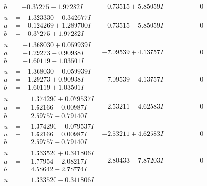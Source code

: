 \documentclass[1p]{elsarticle_modified}
\theoremstyle{definition}
\begin{document}
$$\begin{array}{c|c|c}
\begin{aligned}
b &= -0.37275 - 1.97282 I\end{aligned}
 & -0.73515 + 5.85059 I & \phantom{-0.000000 } 0 \\ \hline\begin{aligned}
u &= -1.323330 - 0.342677 I \\
a &= -0.124269 + 1.289700 I \\
b &= -0.37275 + 1.97282 I\end{aligned}
 & -0.73515 - 5.85059 I & \phantom{-0.000000 } 0 \\ \hline\begin{aligned}
u &= -1.368030 + 0.059939 I \\
a &= -1.29273 - 0.90938 I \\
b &= -1.60119 - 1.03501 I\end{aligned}
 & -7.09539 + 4.13757 I & \phantom{-0.000000 } 0 \\ \hline\begin{aligned}
u &= -1.368030 - 0.059939 I \\
a &= -1.29273 + 0.90938 I \\
b &= -1.60119 + 1.03501 I\end{aligned}
 & -7.09539 - 4.13757 I & \phantom{-0.000000 } 0 \\ \hline\begin{aligned}
u &= \phantom{-}1.374290 + 0.079537 I \\
a &= \phantom{-}1.62166 + 0.00987 I \\
b &= \phantom{-}2.59757 - 0.79140 I\end{aligned}
 & -2.53211 - 4.62583 I & \phantom{-0.000000 } 0 \\ \hline\begin{aligned}
u &= \phantom{-}1.374290 - 0.079537 I \\
a &= \phantom{-}1.62166 - 0.00987 I \\
b &= \phantom{-}2.59757 + 0.79140 I\end{aligned}
 & -2.53211 + 4.62583 I & \phantom{-0.000000 } 0 \\ \hline\begin{aligned}
u &= \phantom{-}1.333520 + 0.341806 I \\
a &= \phantom{-}1.77954 - 2.08217 I \\
b &= \phantom{-}4.58642 - 2.78774 I\end{aligned}
 & -2.80433 - 7.87203 I & \phantom{-0.000000 } 0 \\ \hline\begin{aligned}
u &= \phantom{-}1.333520 - 0.341806 I \\

\end{aligned}
\end{array}$$
\end{document}

